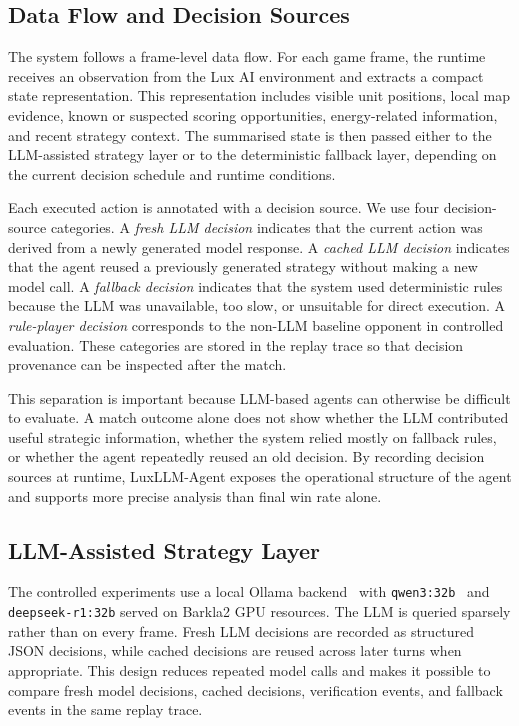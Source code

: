 \documentclass[11pt]{article}
\begin{document}
\subsection{Data Flow and Decision Sources}

The system follows a frame-level data flow. For each game frame, the runtime receives an observation from the Lux AI environment and extracts a compact state representation. This representation includes visible unit positions, local map evidence, known or suspected scoring opportunities, energy-related information, and recent strategy context. The summarised state is then passed either to the LLM-assisted strategy layer or to the deterministic fallback layer, depending on the current decision schedule and runtime conditions.

Each executed action is annotated with a decision source. We use four decision-source categories. A \emph{fresh LLM decision} indicates that the current action was derived from a newly generated model response. A \emph{cached LLM decision} indicates that the agent reused a previously generated strategy without making a new model call. A \emph{fallback decision} indicates that the system used deterministic rules because the LLM was unavailable, too slow, or unsuitable for direct execution. A \emph{rule-player decision} corresponds to the non-LLM baseline opponent in controlled evaluation. These categories are stored in the replay trace so that decision provenance can be inspected after the match.

This separation is important because LLM-based agents can otherwise be difficult to evaluate. A match outcome alone does not show whether the LLM contributed useful strategic information, whether the system relied mostly on fallback rules, or whether the agent repeatedly reused an old decision. By recording decision sources at runtime, LuxLLM-Agent exposes the operational structure of the agent and supports more precise analysis than final win rate alone.

\subsection{LLM-Assisted Strategy Layer}

The controlled experiments use a local Ollama backend~\citep{ollama2024} with \texttt{qwen3:32b}~\citep{yang2025qwen3} and \texttt{deepseek-r1:32b} served on Barkla2 GPU resources. The LLM is queried sparsely rather than on every frame. Fresh LLM decisions are recorded as structured JSON decisions, while cached decisions are reused across later turns when appropriate. This design reduces repeated model calls and makes it possible to compare fresh model decisions, cached decisions, verification events, and fallback events in the same replay trace.
\end{document}
